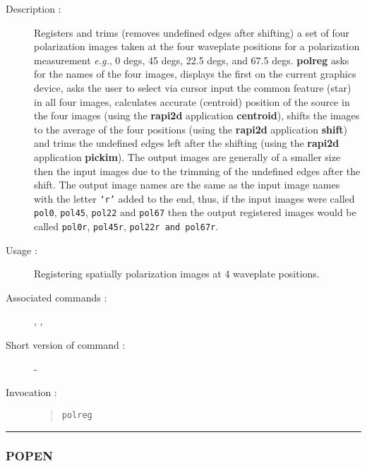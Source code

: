 \begin{description}

\item[Description :] Registers and trims (removes undefined edges after
shifting) a set of four polarization images taken at the four waveplate
positions for a polarization measurement \emph{e.g.}, 0 degs, 45 degs,
22.5 degs, and 67.5 degs.  {\bf polreg} asks for the names of the four
images, displays the first on the current graphics device, asks the
user to select via cursor input the common feature (star) in all four
images, calculates accurate (centroid) position of the source in the
four images (using the {\bf rapi2d} application {\bf centroid}), shifts
the images to the average of the four positions (using the {\bf rapi2d}
application {\bf shift}) and trims the undefined edges left after the
shifting (using the {\bf rapi2d} application {\bf pickim}).  The output
images are generally of a smaller size then the input images due to the
trimming of the undefined edges after the shift.  The output image
names are the same as the input image names with the letter {\tt `r'}
added to the end, thus, if the input images were called {\tt pol0},
{\tt pol45}, {\tt pol22} and {\tt pol67} then the output registered
images would be called {\tt pol0r}, {\tt pol45r}, {\tt pol22r and
pol67r}.

\item[Usage :] Registering spatially polarization images at 4 waveplate
positions.
\item[Associated commands :] {\tt {}},
{\tt {}}, {\tt {}}
\item[Short version of command :] -
\item[Invocation :]

\begin{quote}{\tt  polreg }\end{quote}

\end{description}

\hrule
\subsubsection*{\label{POPEN}POPEN}

